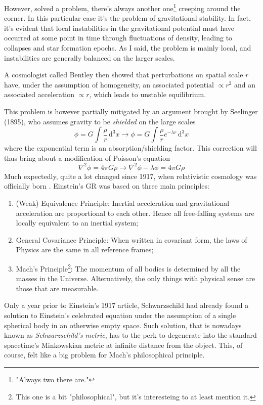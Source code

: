 \par However, solved a problem, there's always another one\footnote{"Always two there are."} creeping around the corner. In this particular case it's the problem of gravitational stability. In fact, it's evident that local instabilities in the gravitational potential must have occurred at some point in time through fluctuations of density, leading to collapses and star formation epochs. As I said, the problem is mainly local, and instabilities are generally balanced on the larger scales.
\par A cosmologist called Bentley then showed that perturbations on spatial scale $r$ have, under the assumption of homogeneity, an associated potential $\propto r^{2}$ and an associated acceleration $\propto r$, which leads to unstable equilibrium.
\par This problem is however partially mitigated by an argument brought by Seelinger (1895), who assumes gravity to be \emph{shielded} on the large scales
\begin{equation*}
    \phi = G\int \frac{\rho}{r}\,\text{d}^{3}x \to \phi = G\int \frac{\rho}{r}e^{-\lambda r}\,\text{d}^{3}x
\end{equation*}
where the exponential term is an absorption/shielding factor. This correction will thus bring about a modification of Poisson's equation
\begin{equation*}
    \nabla^{2}\phi = 4\pi G \rho \to \nabla^{2}\phi -\lambda\phi = 4\pi G\rho
\end{equation*}
Much expectedly, quite a lot changed since 1917, when relativistic cosmology was officially born \cite{1917SPAW.......142E}. Einstein's GR was based on three main principles:
\begin{enumerate}
    \item (Weak) Equivalence Principle: Inertial acceleration and gravitational acceleration are proportional to each other. Hence all free-falling systems are locally equivalent to an inertial system;
    \item General Covariance Principle: When written in covariant form, the laws of Physics are the same in all reference frames;
    \item Mach's Principle\footnote{This one is a bit "philosophical", but it's interesteing to at least mention it.}: The momentum of all bodies is determined by all the masses in the Universe. Alternatively, the only things with physical sense are those that are measurable.
\end{enumerate}
Only a year prior to Einstein's 1917 article, Schwarzschild had already found a solution to Einstein's celebrated equation under the assumption of a single spherical body in an otherwise empty space. Such solution, that is nowadays known as \emph{Schwarzschild's metric}, has to the perk to degenerate into the standard spacetime's Minkowskian metric at infinite distance from the object. This, of course, felt like a big problem for Mach's philosophical principle.
